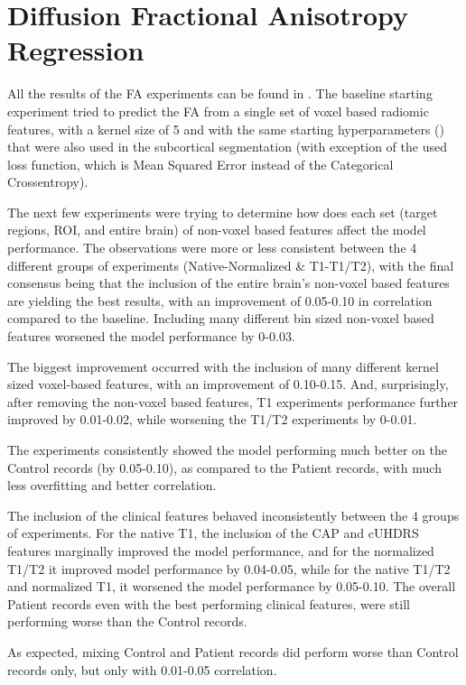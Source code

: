 \section{Diffusion Fractional Anisotropy Regression}

All the results of the \ac{FA} experiments can be found in  .
The baseline starting experiment tried to predict the \ac{FA} from a single set of voxel based radiomic features, with a kernel size of 5 and with the same starting hyperparameters () that were also used in the subcortical segmentation (with exception of the used loss function, which is Mean Squared Error instead of the Categorical Crossentropy).\par
The next few experiments were trying to determine how does each set (target regions, \ac{ROI}, and entire brain) of non-voxel based features affect the model performance. The observations were more or less consistent between the 4 different groups of experiments (Native-Normalized \& T1-T1/T2), with the final consensus being that the inclusion of the entire brain's non-voxel based features are yielding the best results, with an improvement of 0.05-0.10 in correlation compared to the baseline. Including many different bin sized non-voxel based features worsened the model performance by 0-0.03.\par
The biggest improvement occurred with the inclusion of many different kernel sized voxel-based features, with an improvement of 0.10-0.15. And, surprisingly, after removing the non-voxel based features, T1 experiments performance further improved by 0.01-0.02, while worsening the T1/T2 experiments by 0-0.01.\par
The experiments consistently showed the model performing much better on the Control records (by 0.05-0.10), as compared to the Patient records, with much less overfitting and better correlation.\par
The inclusion of the clinical features behaved inconsistently between the 4 groups of experiments. For the native T1, the inclusion of the \ac{CAP} and \ac{cUHDRS} features marginally improved the model performance, and for the normalized T1/T2 it improved model performance by 0.04-0.05, while for the native T1/T2 and normalized T1, it worsened the model performance by 0.05-0.10. The overall Patient records even with the best performing clinical features, were still performing worse than the Control records.\par
As expected, mixing Control and Patient records did perform worse than Control records only, but only with 0.01-0.05 correlation.\par
